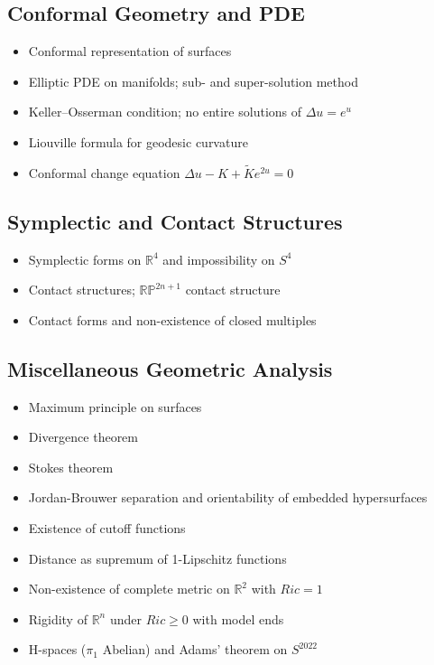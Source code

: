 \documentclass{amsart}
\begin{document}
\subsection{Conformal Geometry and PDE}
\begin{itemize}
    \item Conformal representation of surfaces
    \item Elliptic PDE on manifolds; sub- and super-solution method
    \item Keller--Osserman condition; no entire solutions of $\Delta u = e^u$
    \item Liouville formula for geodesic curvature
    \item Conformal change equation $\Delta u - K + \widetilde{K}e^{2u} = 0$
    \end{itemize}

\subsection{Symplectic and Contact Structures}
\begin{itemize}
    \item Symplectic forms on $\mathbb{R}^4$ and impossibility on $S^4$
    \item Contact structures; $\mathbb{RP}^{2n+1}$ contact structure
    \item Contact forms and non-existence of closed multiples
    \end{itemize}

\subsection{Miscellaneous Geometric Analysis}
\begin{itemize}
    \item Maximum principle on surfaces
    \item Divergence theorem
    \item Stokes theorem
    \item Jordan-Brouwer separation and orientability of embedded hypersurfaces
    \item Existence of cutoff functions
    \item Distance as supremum of 1-Lipschitz functions
    \item Non-existence of complete metric on $\mathbb{R}^2$ with $Ric = 1$
    \item Rigidity of $\mathbb{R}^n$ under $Ric \geq 0$ with model ends
    \item H-spaces ($\pi_1$ Abelian) and Adams' theorem on $S^{2022}$
    \end{itemize}
\end{document}
